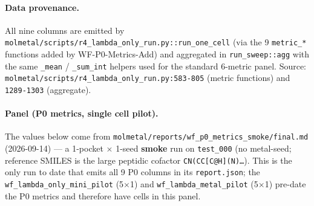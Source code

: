 \paragraph{Data provenance.}
All nine columns are emitted by
\texttt{molmetal/scripts/r4\_lambda\_only\_run.py::run\_one\_cell}
(via the 9 \texttt{metric\_*} functions added by WF-P0-Metrics-Add)
and aggregated in \texttt{run\_sweep::agg} with the same
\texttt{\_mean} / \texttt{\_sum\_int} helpers used for the standard
6-metric panel.  Source: \texttt{molmetal/scripts/r4\_lambda\_only\_run.py:583-805}
(metric functions) and \texttt{1289-1303} (aggregate).

\paragraph{Panel (P0 metrics, single cell pilot).}
The \MEASURED{} values below come from
\texttt{molmetal/reports/wf\_p0\_metrics\_smoke/final.md}
(2026-09-14) --- a 1-pocket $\times$ 1-seed \textbf{smoke} run on
\texttt{test\_000} (no metal-seed; reference SMILES is the large
peptidic cofactor \texttt{CN(CC[C@H](N)\ldots}).  This is the only
run to date that emits all 9 P0 columns in its \texttt{report.json};
the \texttt{wf\_lambda\_only\_mini\_pilot} (5$\times$1) and
\texttt{wf\_lambda\_metal\_pilot} (5$\times$1) pre-date the P0
metrics and therefore have \DESIGN{} cells in this panel.


